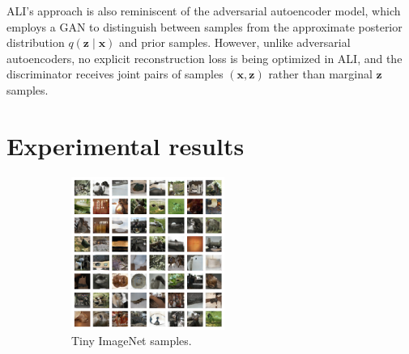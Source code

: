 \documentclass{article}
\newcommand{\figureHeight}{5cm}
\begin{document}
ALI's approach is also reminiscent of the adversarial autoencoder model, which
employs a GAN to distinguish between samples from the approximate posterior
distribution $q(\bm{z} \mid \bm{x})$ and prior samples. However, unlike
adversarial autoencoders, no explicit reconstruction loss is being optimized in
ALI, and the discriminator receives joint pairs of samples $(\bm{x}, \bm{z})$
rather than marginal $\bm{z}$ samples.

\section{Experimental results}

\begin{figure}[t]
    \centering
    \begin{subfigure}[t]{0.49\textwidth}
        \centering
        \includegraphics[height=\figureHeight]{tiny_imagenet_samples.png}
        \caption{\label{fig:tiny_imagenet_samples} Tiny ImageNet samples.}
    \end{subfigure}
    \hfill
    \begin{subfigure}[t]{0.49\textwidth}
        \centering

\end{subfigure}
\end{figure}
\end{document}
